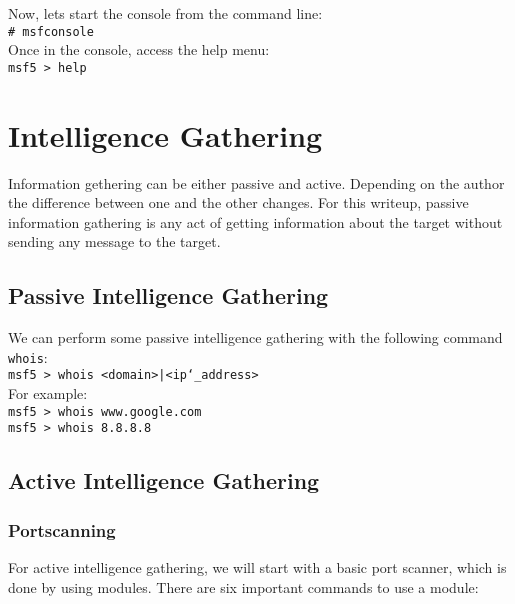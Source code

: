 \documentclass[twocolumn]{article}
\begin{document}
\noindent Now, lets start the console from the command line: \\

\indent\texttt{\# msfconsole}\\

\noindent Once in the console, access the help menu: \\

\indent\texttt{msf5 > help}\\

\section{Intelligence Gathering}
Information gethering can be either passive and active. Depending on the author the difference between one and the other changes. For this writeup, passive information gathering is any act of getting information about the target without sending any message to the target.

\subsection{Passive Intelligence Gathering}

We can perform some passive intelligence gathering with the following command \texttt{whois}:\\

\indent\texttt{msf5 > whois <domain>|<ip\char`\_address>} \\

\noindent For example:\\

\indent\texttt{msf5 > whois www.google.com}\\
\indent\texttt{msf5 > whois 8.8.8.8}\\

\subsection{Active Intelligence Gathering}

\subsubsection{Portscanning}
For active intelligence gathering, we will start with a basic port scanner, which is done by using modules. There are six important commands to use a module:
\end{document}
